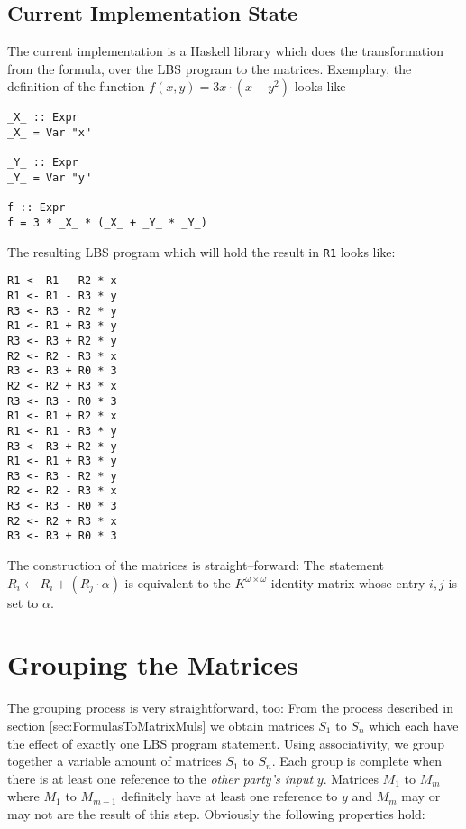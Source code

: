 \documentclass[12pt, a4paper]{article}
\begin{document}
\subsection{Current Implementation State}

The current implementation is a Haskell library which does the transformation
from the formula, over the LBS program to the matrices. Exemplary,
the definition of the function $f(x,y) = 3x \cdot (x + y^2)$ looks like

\lstset{language=Haskell}

\begin{lstlisting}
_X_ :: Expr
_X_ = Var "x"

_Y_ :: Expr
_Y_ = Var "y"

f :: Expr
f = 3 * _X_ * (_X_ + _Y_ * _Y_)
\end{lstlisting}

\noindent{}The resulting LBS program which will hold the result in \texttt{R1}
looks like:

\begin{lstlisting}
R1 <- R1 - R2 * x
R1 <- R1 - R3 * y
R3 <- R3 - R2 * y
R1 <- R1 + R3 * y
R3 <- R3 + R2 * y
R2 <- R2 - R3 * x
R3 <- R3 + R0 * 3
R2 <- R2 + R3 * x
R3 <- R3 - R0 * 3
R1 <- R1 + R2 * x
R1 <- R1 - R3 * y
R3 <- R3 + R2 * y
R1 <- R1 + R3 * y
R3 <- R3 - R2 * y
R2 <- R2 - R3 * x
R3 <- R3 - R0 * 3
R2 <- R2 + R3 * x
R3 <- R3 + R0 * 3
\end{lstlisting}

\noindent{}The construction of the matrices is straight--forward: The statement
$R_i \leftarrow R_i + (R_j \cdot \alpha)$ is equivalent to the $K^{\omega \times
\omega}$ identity matrix whose entry $i,j$ is set to $\alpha$.


\section{Grouping the Matrices}
\label{sec:matrix-grouping}

The grouping process is very straightforward, too: From the process described in
section \ref{sec:FormulasToMatrixMuls} we obtain matrices $S_1$ to $S_n$ which
each have the effect of exactly one LBS program statement. Using associativity,
we group together a variable amount of matrices $S_1$ to $S_n$. Each group is
complete when there is at least one reference to the \emph{other party's input}
$y$.  Matrices $M_1$ to $M_m$ where $M_1$ to $M_{m-1}$ definitely have at least
one reference to $y$ and $M_m$ may or may not are the result of this step.
Obviously the following properties hold:
\end{document}
